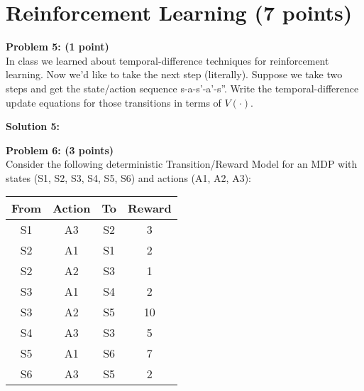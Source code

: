 \documentclass[]{article}
\begin{document}
\clearpage


\section{Reinforcement Learning (7 points)}

\textbf{Problem 5: (1 point)}\\
In class we learned about temporal-difference techniques for reinforcement learning. Now we'd like to take the next step (literally). Suppose we take two steps and get the state/action sequence s-a-s'-a'-s''. Write the temporal-difference update equations for those transitions in terms of $V(\cdot)$.

\bigskip

\textbf{Solution 5:}

\clearpage
\textbf{Problem 6: (3 points)}\\
Consider the following deterministic Transition/Reward Model for an MDP with states (S1, S2, S3, S4, S5, S6) and actions (A1, A2, A3):
\begin{table}[htb]
\centering
    \begin{tabular}{|c|c|c|c|}
      \hline
        From &  Action &    To &    Reward \\\hline
        S1 &    A3 &    S2 &    3 \\\hline
        S2 &    A1 &    S1 &    2 \\\hline
        S2 &    A2 &    S3 &    1 \\\hline
        S3 &    A1 &    S4 &    2 \\\hline
        S3 &    A2 &    S5 &    10 \\\hline
        S4 &    A3 &    S3 &    5 \\\hline
        S5 &    A1 &    S6 &    7 \\\hline
        S6 &    A3 &    S5 &    2 \\\hline
    \end{tabular}
\end{table}
\end{document}
